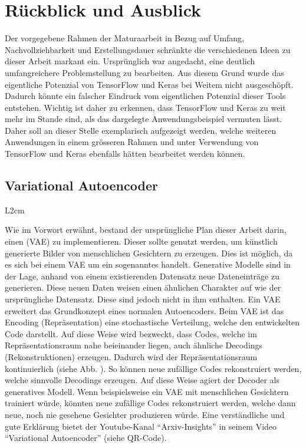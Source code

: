 \chapter*{Rückblick und Ausblick}

Der vorgegebene Rahmen der Maturaarbeit in Bezug auf Umfang,
Nachvollziehbarkeit und Erstellungsdauer schränkte die verschiedenen Ideen zu dieser
Arbeit markant ein. Ursprünglich war angedacht, eine deutlich umfangreichere
Problemstellung zu bearbeiten. Aus diesem Grund wurde das eigentliche Potenzial von
TensorFlow und Keras bei Weitem nicht ausgeschöpft. Dadurch könnte ein falscher
Eindruck vom eigentlichen Potenzial dieser Tools entstehen. Wichtig ist daher zu
erkennen, dass TensorFlow und Keras zu weit mehr im Stande sind, als das
dargelegte Anwendungsbeispiel vermuten lässt.
\para{}
Daher soll an dieser Stelle exemplarisch aufgezeigt werden, welche
weiteren Anwendungen in einem grösseren Rahmen und unter Verwendung von
TensorFlow und Keras ebenfalls hätten bearbeitet werden können.

\section*{Variational Autoencoder}
\begin{wrapfigure}{L}{2cm}
\end{wrapfigure}
Wie im Vorwort erwähnt, bestand der ursprüngliche Plan dieser Arbeit
darin, einen  (VAE) zu implementieren. Dieser sollte genutzt werden,
um künstlich generierte Bilder von menschlichen Gesichtern zu erzeugen.
Dies ist möglich, da es sich bei einem VAE um ein sogenanntes
 handelt.
\para{}
Generative Modelle sind in der Lage, anhand
von einem existierenden Datensatz neue Dateneinträge zu generieren. Diese neuen Daten
weisen einen ähnlichen Charakter auf wie der ursprüngliche Datensatz. Diese sind
jedoch nicht in ihm enthalten.
\para{}
Ein VAE erweitert das Grundkonzept eines normalen Autoencoders. Beim VAE ist das
Encoding (Repräsentation) eine stochastische Verteilung, welche den entwickelten
Code darstellt.
Auf diese Weise wird bezweckt, dass Codes, welche im Repräsentationsraum nahe beieinander liegen, auch ähnliche
Decodings (Rekonstruktionen) erzeugen. Dadurch wird der Repräsentationsraum
kontinuierlich (siehe Abb. ). So können neue zufällige Codes
rekonstruiert werden, welche sinnvolle Decodings erzeugen. Auf diese Weise agiert der Decoder als generatives
Modell. Wenn beispielsweise ein VAE mit menschlichen Gesichtern
trainiert würde, könnten neue zufällige Codes rekonstruiert werden, welche dann
neue, noch nie gesehene Gesichter produzieren würde.
\para{}
Eine verständliche und gute Erklärung bietet der Youtube-Kanal
``Arxiv-Insights'' in seinem Video ``Variational Autoencoder'' (siehe QR-Code).

